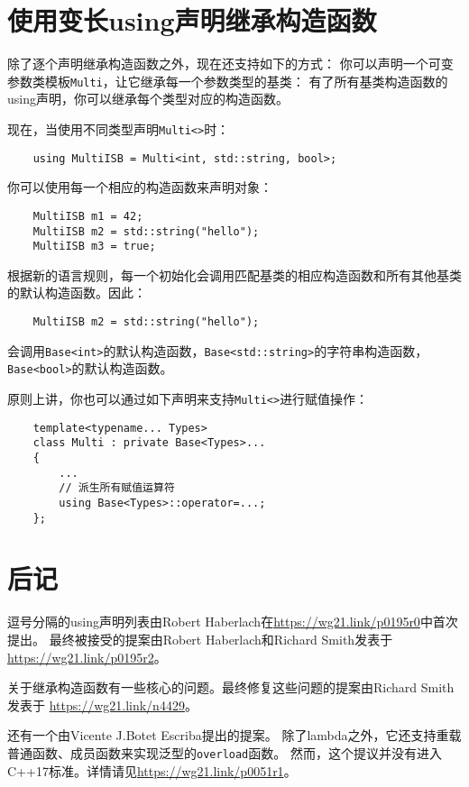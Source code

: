 \section{使用变长using声明继承构造函数}
除了逐个声明继承构造函数之外，现在还支持如下的方式：
你可以声明一个可变参数类模板\texttt{Multi}，让它继承每一个参数类型的基类：
有了所有基类构造函数的using声明，你可以继承每个类型对应的构造函数。

现在，当使用不同类型声明\texttt{Multi<>}时：
\begin{lstlisting}
    using MultiISB = Multi<int, std::string, bool>;
\end{lstlisting}
你可以使用每一个相应的构造函数来声明对象：
\begin{lstlisting}
    MultiISB m1 = 42;
    MultiISB m2 = std::string("hello");
    MultiISB m3 = true;
\end{lstlisting}
根据新的语言规则，每一个初始化会调用匹配基类的相应构造函数和所有其他基类的默认构造函数。因此：
\begin{lstlisting}
    MultiISB m2 = std::string("hello");
\end{lstlisting}
会调用\texttt{Base<int>}的默认构造函数，\texttt{Base<std::string>}的字符串构造函数，
\texttt{Base<bool>}的默认构造函数。

原则上讲，你也可以通过如下声明来支持\texttt{Multi<>}进行赋值操作：
\begin{lstlisting}
    template<typename... Types>
    class Multi : private Base<Types>...
    {
        ...
        // 派生所有赋值运算符
        using Base<Types>::operator=...;
    };
\end{lstlisting}

\section{后记}
逗号分隔的using声明列表由Robert Haberlach在\url{https://wg21.link/p0195r0}中首次提出。
最终被接受的提案由Robert Haberlach和Richard Smith发表于\url{https://wg21.link/p0195r2}。

关于继承构造函数有一些核心的问题。最终修复这些问题的提案由Richard Smith发表于
\url{https://wg21.link/n4429}。

还有一个由Vicente J.Botet Escriba提出的提案。
除了lambda之外，它还支持重载普通函数、成员函数来实现泛型的\texttt{overload}函数。
然而，这个提议并没有进入C++17标准。详情请见\url{https://wg21.link/p0051r1}。